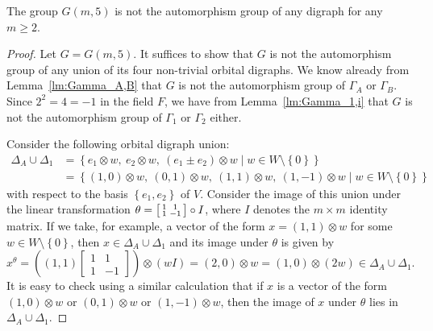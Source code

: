 \documentclass[ALCO, Unicode]{cedram}
\begin{document}
\begin{theorem} \label{thm:q=5}
The group $G{\left(m, 5 \right)}$ is not the automorphism group of any digraph for any $m \geqslant 2$.
\end{theorem}
\begin{proof}
Let $G = G{\left(m, 5 \right)}$. It suffices to show that $G$ is not the automorphism group of any union of its four non-trivial orbital digraphs. We know already from Lemma~\ref{lm:Gamma_A,B} that $G$ is not the automorphism group of $\Gamma_A$ or $\Gamma_B$. Since $2^2 = 4 = -1$ in the field $F$, we have from Lemma~\ref{lm:Gamma_1,i} that $G$ is not the automorphism group of $\Gamma_1$ or $\Gamma_2$ either.

Consider the following orbital digraph union:
\begin{align*}
\Delta_A \cup \Delta_1 &= \left\{e_1 \otimes w,\ e_2 \otimes w,\ \left(e_1 \pm e_2 \right) \otimes w \mid w \in W \setminus \left\{0 \right\}\right\} \\
&= \left\{\left(1, 0 \right) \otimes w,\ \left(0, 1 \right) \otimes w,\ \left(1, 1 \right) \otimes w,\ \left(1, -1 \right) \otimes w \mid w \in W \setminus \left\{0 \right\}\right\}
\end{align*}
with respect to the basis $\left\{e_1, e_2 \right\}$ of $V$. Consider the image of this union under the linear transformation $\theta = \begin{bsmallmatrix} 1 & 1 \\ 1 & -1 \end{bsmallmatrix} \circ I$, where $I$ denotes the $m \times m$ identity matrix. If we take, for example, a vector of the form $x = \left(1, 1 \right) \otimes w$ for some $w \in W \setminus \left\{0 \right\}$, then $x \in \Delta_A \cup \Delta_1$ and its image under $\theta$ is given by
\begin{displaymath}
x^\theta = \left(\left(1, 1 \right) \begin{bmatrix} 1 & 1 \\ 1 & -1 \end{bmatrix} \right) \otimes \left(wI \right) = \left(2, 0 \right) \otimes w = \left(1, 0 \right) \otimes \left(2w \right) \in \Delta_A \cup \Delta_1.
\end{displaymath}
It is easy to check using a similar calculation that if $x$ is a vector of the form $\left(1, 0 \right) \otimes w$ or $\left(0, 1 \right) \otimes w$ or $\left(1, -1 \right) \otimes w$, then the image of $x$ under $\theta$ lies in $\Delta_A \cup \Delta_1$.


\end{proof}
\end{document}
